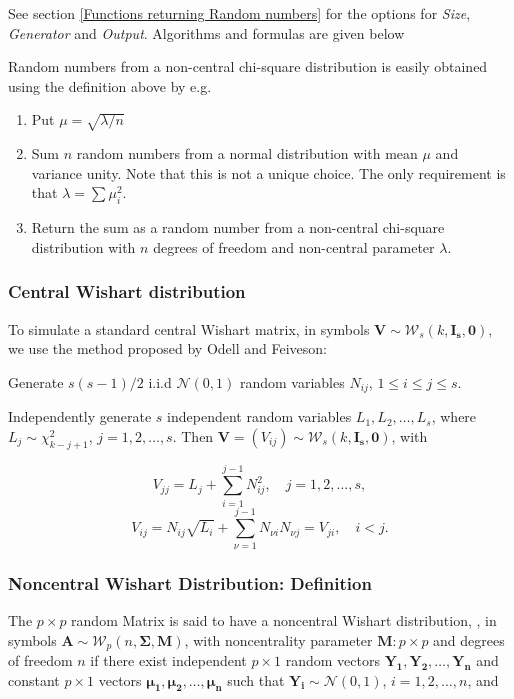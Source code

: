 \vspace{0.3cm}
See section \ref{Functions returning Random numbers} for the options for  {\itshape\sffamily Size},  {\itshape\sffamily Generator} and {\itshape\sffamily Output}. Algorithms and formulas are given below


Random numbers from a non-central chi-square distribution is easily obtained using the
deﬁnition above by e.g.

\begin{enumerate}
	\item Put $\mu = \sqrt{\lambda/n}$
	\item Sum $n$ random numbers from a normal distribution with mean $\mu$ and variance unity.
	Note that this is not a unique choice. The only requirement is that $\lambda = \sum \mu_i^2$.
	\item Return the sum as a random number from a non-central chi-square distribution with
	$n$ degrees of freedom and non-central parameter $\lambda$.
\end{enumerate}



\subsubsection{Central Wishart distribution}

To simulate a standard central Wishart matrix, in symbols $\boldsymbol{V}  \sim \mathcal{W}_s(k, \boldsymbol{I_s}, \boldsymbol{0})$, we use the method proposed by Odell and Feiveson:

Generate $s(s-1)/2$ i.i.d $\mathcal{N}(0, 1)$ random variables $N_{ij}$, $1 \leq i \leq j \leq s$.


Independently generate $s$ independent random variables $L_1, L_2,\ldots, L_s$, where $L_j \sim \chi^2_{k-j+1}$, $j=1,2,\ldots,s$. Then $\boldsymbol{V} =\left(V_{ij}\right) \sim \mathcal{W}_s(k, \boldsymbol{I_s}, \boldsymbol{0})$, with

\begin{equation}
	V_{jj} = L_j + \sum_{i=1}^{j-1} N_{ij}^2, \quad j=1,2,\ldots,s,
\end{equation}
\begin{equation}
	V_{ij} = N_{ij} \sqrt{L_i} + \sum_{\nu=1}^{j-1} N_{\nu i} N_{\nu j} = V_{ji}, \quad i<j.
\end{equation}


\subsubsection{Noncentral Wishart Distribution: Definition}
The $p \times p$ random Matrix is said to have a noncentral Wishart distribution, , in symbols $\boldsymbol{A}  \sim \mathcal{W}_p(n, \boldsymbol{\Sigma}, \boldsymbol{M})$, with noncentrality parameter $\boldsymbol{M}:p \times p$ and degrees of freedom $n$ if there exist independent $p \times 1$ random vectors $\boldsymbol{Y_1}, \boldsymbol{Y_2}, \ldots, \boldsymbol{Y_n}$ and constant  $p \times 1$ vectors $\boldsymbol{\mu_1}, \boldsymbol{\mu_2}, \ldots, \boldsymbol{\mu_n}$ such that $\boldsymbol{Y_i} \sim \mathcal{N}(0, 1)$, $i=1,2,\ldots,n$, and 

